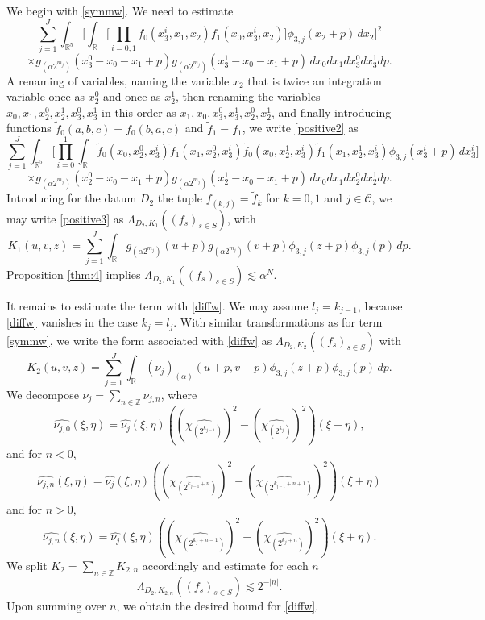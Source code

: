 \documentclass[12pt,reqno]{amsart}
\theoremstyle{plain}
\theoremstyle{definition}
\numberwithin{equation}{section}
\newcommand{\Z}{{\mathbb Z}}
\newcommand{\R}{{\mathbb R}}
\begin{document}
We begin with  \eqref{symmw}. We need to estimate
\[
 \sum_{j=1}^J \int_{\R^5}  \Big[ \int_{\R} \Big[ \prod_{i=0,1}f_0(x_3^i, x_1,x_2) f_1(x_0,x_3^i,x_2)\Big ]   \phi_{3,j} (x_2+p) \,dx_2 \Big]^2       \]
 \begin{equation}
     \label{positive2}
 \times g_{(\alpha 2^{m_j})}(x_3^0-x_0-x_1+p)g_{(\alpha 2^{m_j})}(x_3^1-x_0-x_1+p) \,  dx_0 dx_1 dx_3^0 dx_3^1   dp .
 \end{equation}
A renaming of variables, naming the variable $x_2$ that is twice an integration variable once as $x_2^0$ and once as $x_2^1$, then 
renaming the variables $x_0,x_1,x_2^0,x_2^1,x_3^0,x_3^1$ in this order as
$x_1,x_0,x_3^0,x_3^1,x_2^0,x_2^1$, and finally 
introducing functions $\widetilde{f}_0(a,b,c)=f_0(b,a,c)$ and $\widetilde{f}_1=f_1$, we write \eqref{positive2} as
\[
 \sum_{j=1}^J \int_{\R^5}  \Big[ \prod_{i=0}^1\int_{\R}  \widetilde{f}_0(x_0, x_2^{0},x_3^i) \widetilde{f}_1(x_1,x_2^0,x_3^i) \widetilde{f}_0(x_0,x_2^1,x_3^i) \widetilde{f}_1(x_1,x_2^1,x_3^i)  \phi_{3,j} (x_3^i+p)\, dx_3^i \Big]      \]
 \begin{equation}
     \label{positive3}
 \times g_{(\alpha 2^{m_j})}(x_2^0-x_0-x_1+p)g_{(\alpha 2^{m_j})}(x_2^1-x_0-x_1+p) \, dx_0 dx_1 dx_2^0 dx_2^1   dp.
 \end{equation}
Introducing for the datum $D_2$ the tuple 
$f_{(k,j)}=\widetilde{f}_k$ for $k=0,1$ and $j\in \mathcal{C}$, we may write \eqref{positive3} as
$\Lambda_{D_2,K_1}((f_s)_{s\in S})$, with
$$K_1(u,v,z)=
\sum_{j=1}^J \int_{\R}g_{(\alpha 2^{m_j})}(u+p) g_{(\alpha 2^{m_j})}(v+p)
 {\phi}_{3,j}(z+p){\phi}_{3,j}(p)  \, dp .$$
Proposition \ref{thm:4} implies $\Lambda_{D_2,K_1}((f_s)_{s\in S})\lesssim \alpha^{N}$.

It remains to estimate the term with \eqref{diffw}. We may assume $l_j=k_{j-1}$, because \eqref{diffw} vanishes in the case $k_j=l_j$. With similar 
transformations as for term  \eqref{symmw}, we write the form associated with \eqref{diffw} as
$\Lambda_{D_2,K_2}((f_s)_{s\in S})$ with 
\[K_2(u,v,z)=
\sum_{j=1}^J
\int_{\R}(\nu_j)_{(\alpha)}(u+p,v+p)
 {\phi}_{3,j}(z+p){\phi}_{3,j}(p)  \, dp .\]
 We decompose $\nu_j=\sum_{n\in \Z} \nu_{j,n}$, where
 $$\widehat{\nu_{j,0}}(\xi,\eta)= \widehat{\nu_j}(\xi,\eta) 
 ((\widehat{\chi_{(2^{k_{j-1}})}})^2-(\widehat{\chi_{(2^{k_{j}})}})^2)(\xi+\eta),$$
 and for $n<0$,
 \begin{equation}
     \label{nujn-neq}
     \widehat{\nu_{j,n}}(\xi,\eta)= \widehat{\nu_j}(\xi,\eta) 
 ((\widehat{\chi_{(2^{k_{j-1}+n})}})^2-(\widehat{\chi_{(2^{k_{j-1}+n+1})}})^2)(\xi+\eta)
 \end{equation}
 and for $n>0$,
  \begin{equation}
     \label{nujn-pos}
     \widehat{\nu_{j,n}}(\xi,\eta)= \widehat{\nu_j}(\xi,\eta) 
 ((\widehat{\chi_{(2^{k_{j}+n-1})}})^2-(\widehat{\chi_{(2^{k_{j}+n})}})^2)(\xi+\eta).
 \end{equation}
We split $K_2=\sum_{n\in \Z} K_{2,n}$
accordingly and estimate for each $n$
\[\Lambda_{D_2,K_{2,n}}((f_s)_{s\in S})\lesssim 2^{-|n|}.\]
Upon summing over $n$, we obtain the desired bound for \eqref{diffw}.
\end{document}
